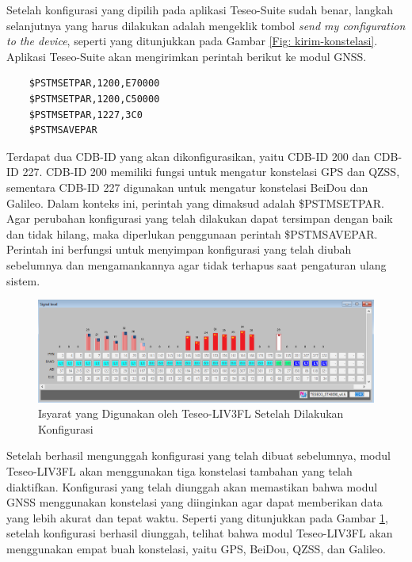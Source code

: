 Setelah konfigurasi yang dipilih pada aplikasi Teseo-Suite sudah benar, langkah selanjutnya yang harus dilakukan adalah mengeklik tombol \textit{send my configuration to the device}, seperti yang ditunjukkan pada Gambar \ref{Fig: kirim-konstelasi}. Aplikasi Teseo-Suite akan mengirimkan perintah berikut ke modul GNSS.

\begin{verbatim}
	$PSTMSETPAR,1200,E70000
	$PSTMSETPAR,1200,C50000
	$PSTMSETPAR,1227,3C0
	$PSTMSAVEPAR
\end{verbatim}

Terdapat dua CDB-ID yang akan dikonfigurasikan, yaitu CDB-ID 200 dan CDB-ID 227. CDB-ID 200 memiliki fungsi untuk mengatur konstelasi GPS dan QZSS, sementara CDB-ID 227 digunakan untuk mengatur konstelasi BeiDou dan Galileo. Dalam konteks ini, perintah yang dimaksud adalah \$PSTMSETPAR. Agar perubahan konfigurasi yang telah dilakukan dapat tersimpan dengan baik dan tidak hilang, maka diperlukan penggunaan perintah \$PSTMSAVEPAR. Perintah ini berfungsi untuk menyimpan konfigurasi yang telah diubah sebelumnya dan mengamankannya agar tidak terhapus saat pengaturan ulang sistem. 

\begin{figure}[H]
	\centering
	\includegraphics[width=14cm]{contents/chapter-3/setting-konstelasi/setelah-konfigurasi.png}
	\caption{Isyarat yang Digunakan oleh Teseo-LIV3FL Setelah Dilakukan Konfigurasi}
	\label{Fig: setelah-konfigurasi}
\end{figure}

Setelah berhasil mengunggah konfigurasi yang telah dibuat sebelumnya, modul Teseo-LIV3FL akan menggunakan tiga konstelasi tambahan yang telah diaktifkan. Konfigurasi yang telah diunggah akan memastikan bahwa modul GNSS menggunakan konstelasi yang diinginkan agar dapat memberikan data yang lebih akurat dan tepat waktu. Seperti yang ditunjukkan pada Gambar \ref{Fig: setelah-konfigurasi}, setelah konfigurasi berhasil diunggah, telihat bahwa modul Teseo-LIV3FL akan menggunakan empat buah konstelasi, yaitu GPS, BeiDou, QZSS, dan Galileo. 

